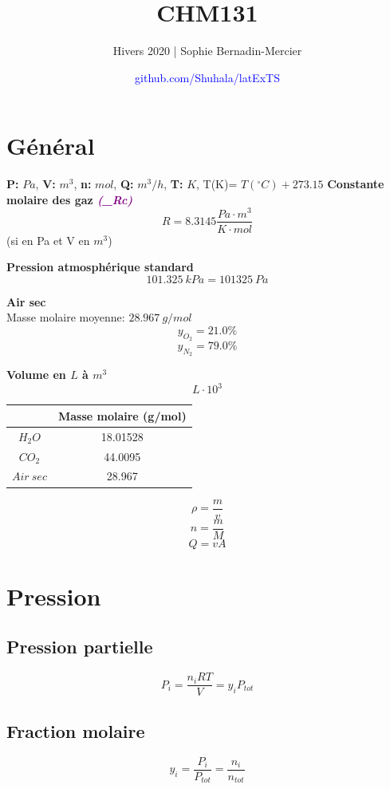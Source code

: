 \documentclass[twocolumn,letterpaper,8pt]{extarticle}
\title{CHM131}
\author{Hivers 2020 | Sophie Bernadin-Mercier}
\date{\textcolor{blue}{github.com/Shuhala/latExTS}}
\newcommand{\ti}[1]{\textcolor{purple}{\footnotesize\textit{\textbf{(\_#1)}}}}
\begin{document}
\maketitle
\tableofcontents

\section{Général}
\begin{center}
    \textbf{P:} $Pa$,
    \textbf{V:} $m^3$,
    \textbf{n:} $mol$,
    \textbf{Q:} $m^3/h$,
    \textbf{T:} $K$,
    T(K)= $T(^\circ C) + 273.15$
    \vskip5pt
    \textbf{Constante molaire des gaz \ti{Rc}}
    $$R=8.3145 \frac{Pa\cdot m^3}{K\cdot mol}$${\scriptsize(si en Pa et V en $m^3$)}
    
    \textbf{Pression atmosphérique standard}
    $$101.325\ kPa=101325\ Pa$$
    
    \textbf{Air sec}\\
    Masse molaire moyenne: $28.967\ g/mol$
    $$y_{O_2}=21.0\%$$
    $$y_{N_2}=79.0\%$$
    
    \textbf{Volume en $L$ à $m^3$}
    $$L \cdot 10^3$$
    
    \begin{tabular}{|c|c|} 
        \hline
        & Masse molaire (g/mol) \\
        \hline
        $H_2O$ & 18.01528 \\
        \hline
        $CO_2$ & 44.0095 \\
        \hline
        $Air\ sec$ & 28.967 \\
        \hline
    \end{tabular}
\end{center}
$$\rho=\frac{m}{v}$$
$$n=\frac{m}{M}$$
$$Q=vA$$

\newpage
\section{Pression}
\subsection{Pression partielle}
$$P_i=\frac{n_iRT}{V}=y_i P_{tot}$$

\subsection{Fraction molaire}
$$y_i=\frac{P_i}{P_{tot}}=\frac{n_i}{n_{tot}}$$
\end{document}
